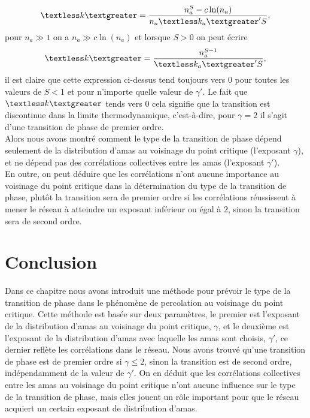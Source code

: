  \begin{equation}
 \km=\frac{n_a^S-c\ln(n_a)}{n_a\kma' S},
 \end{equation}
  pour $n_a\gg1$ on a $n_a\gg c\ln(n_a)$ et lorsque $S>0$ on peut écrire
  \begin{equation}
  \km=\frac{n_a^{S-1}}{\kma' S},
  \end{equation}
  il est claire que cette expression ci-dessus tend toujours vers $0$ pour toutes les valeurs de $S<1$ et pour n'importe quelle valeur de $\gamma'$. Le fait que $\km$ tends vers $0$ cela signifie que la transition est discontinue dans la limite thermodynamique, c'est-à-dire, pour $\gamma=2$ il s'agit d'une transition de phase de premier ordre.\\
  Alors nous avons montré comment le type de la transition de phase dépend seulement de la distribution d'amas au voisinage du point critique (l'exposant $\gamma$), et ne dépend pas des corrélations collectives entre les amas (l'exposant $\gamma'$). \\ 
  En outre, on peut déduire que les corrélations n'ont aucune importance au voisinage du point critique dans la détermination du type de la transition de phase, plutôt  la transition sera de premier ordre si les corrélations réussissent à mener le réseau à atteindre un exposant inférieur ou égal à $2$, sinon la transition sera de second ordre. 
\section{Conclusion}
Dans ce chapitre nous avons introduit une méthode pour prévoir  le type de la transition de phase dans le phénomène de percolation au voisinage du point critique. Cette méthode est basée sur deux paramètres, le premier est l'exposant de la distribution d'amas au voisinage du point critique, $\gamma$, et le deuxième est l'exposant de la distribution d'amas avec laquelle les amas sont choisis, $\gamma'$, ce dernier reflète les corrélations dans le réseau. Nous avons trouvé qu'une transition de phase est de premier ordre si $\gamma\leq2$, sinon la transition est de second ordre, indépendamment de la valeur de $\gamma'$. On en déduit que les corrélations collectives entre les amas au voisinage du point critique n'ont aucune influence sur le type de la transition de phase, mais elles jouent un rôle important pour que le réseau acquiert un certain exposant de distribution d'amas.   

